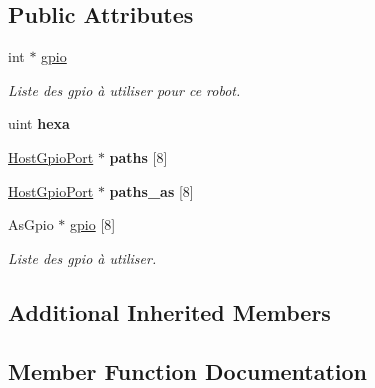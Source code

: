 \subsection*{Public Attributes}
\begin{DoxyCompactItemize}
\item 
\mbox{\label{classLedDriver_a7a6d59afba78a2368c07a10168f39ca8}} 
int $\ast$ \hyperlink{classLedDriver_a7a6d59afba78a2368c07a10168f39ca8}{gpio}
\begin{DoxyCompactList}\small\item\em Liste des gpio à utiliser pour ce robot. \end{DoxyCompactList}\item 
\mbox{\label{classLedDriver_a7e41b321ba077e0bbc54cf850c487e0f}} 
uint {\bfseries hexa}
\item 
\mbox{\label{classLedDriver_ad6006ec56efcaf26e5f91e37ba14b1e3}} 
\hyperlink{classHostGpioPort}{Host\+Gpio\+Port} $\ast$ {\bfseries paths} \mbox{[}8\mbox{]}
\item 
\mbox{\label{classLedDriver_aebefe9a5abc5b31601c4eca02a37d5c7}} 
\hyperlink{classHostGpioPort}{Host\+Gpio\+Port} $\ast$ {\bfseries paths\+\_\+as} \mbox{[}8\mbox{]}
\item 
\mbox{\label{classLedDriver_a57fcf4e859768075689adccf637eda37}} 
As\+Gpio $\ast$ \hyperlink{classLedDriver_a57fcf4e859768075689adccf637eda37}{gpio} \mbox{[}8\mbox{]}
\begin{DoxyCompactList}\small\item\em Liste des gpio à utiliser. \end{DoxyCompactList}\end{DoxyCompactItemize}
\subsection*{Additional Inherited Members}


\subsection{Member Function Documentation}
\mbox{\label{classLedDriver_af5ec63943cb92b14a887fdd2a5491e93}} 
